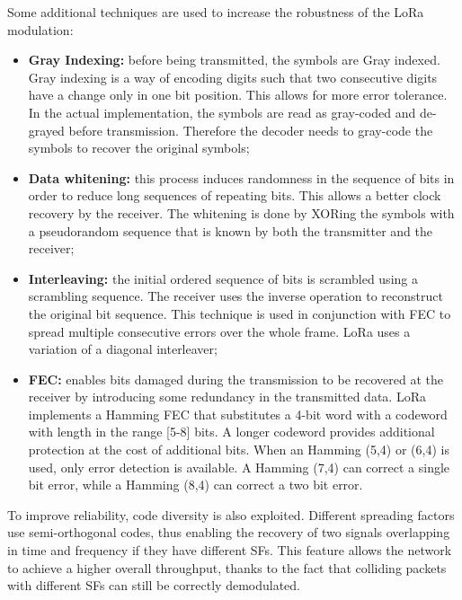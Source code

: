 Some additional techniques are used to increase the robustness of the LoRa modulation:

\begin{itemize}

\item \textbf{Gray Indexing:} before being transmitted, the symbols are Gray indexed. Gray indexing is a way of encoding digits such that two consecutive digits have a change only in one bit position. This allows for more error tolerance. In the actual implementation, the symbols are read as gray-coded and de-grayed before transmission. Therefore the decoder needs to gray-code the symbols to recover the original symbols;

\item \textbf{Data whitening:} this process induces randomness in the sequence of bits in order to reduce long sequences of repeating bits. This allows a better clock recovery by the receiver. The whitening is done by XORing the symbols with a pseudorandom sequence that is known by both the transmitter and the receiver;
    
\item \textbf{Interleaving:} the initial ordered sequence of bits is scrambled using a scrambling sequence. The receiver uses the inverse operation to reconstruct the original bit sequence. This technique is used in conjunction with \gls{FEC} to spread multiple consecutive errors over the whole frame. LoRa uses a variation of a diagonal interleaver;

\item \textbf{\gls{FEC}:} enables bits damaged during the transmission to be recovered at the receiver by introducing some redundancy in the transmitted data. LoRa implements a Hamming \gls{FEC} that substitutes a 4-bit word with a codeword with length in the range [5-8] bits. A longer codeword provides additional protection at the cost of additional bits. When an Hamming (5,4) or (6,4) is used, only error detection is available. A Hamming (7,4) can correct a single bit error, while a Hamming (8,4) can correct a two bit error.

\end{itemize}

To improve reliability, code diversity is also exploited. Different spreading factors use semi-orthogonal codes, thus enabling the recovery of two signals overlapping in time and frequency if they have different \glspl{SF}. This feature allows the network to achieve a higher overall throughput, thanks to the fact that colliding packets with different \glspl{SF} can still be correctly demodulated.

